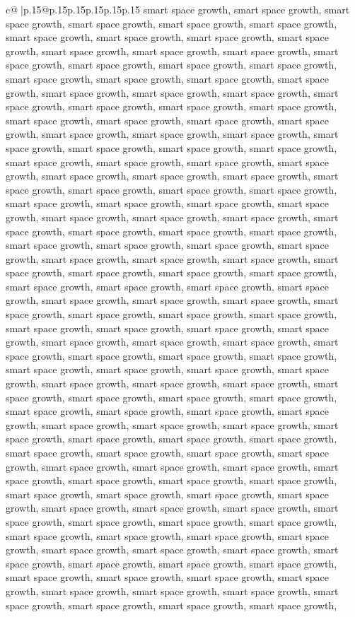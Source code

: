 \documentclass{article}
\begin{document}
{\begin{supertabular}{c@{$\;$}|p{.15\linewidth}@{}p{.15\linewidth}p{.15\linewidth}p{.15\linewidth}p{.15\linewidth}p{.15\linewidth}}
{{{smart space growth, smart space growth, smart space growth, smart space growth, smart space growth, smart space growth, smart space growth, smart space growth, smart space growth, smart space growth, smart space growth, smart space growth, smart space growth, smart space growth, smart space growth, smart space growth, smart space growth, smart space growth, smart space growth, smart space growth, smart space growth, smart space growth, smart space growth, smart space growth, smart space growth, smart space growth, smart space growth, smart space growth, smart space growth, smart space growth, smart space growth, smart space growth, smart space growth, smart space growth, smart space growth, smart space growth, smart space growth, smart space growth, smart space growth, smart space growth, smart space growth, smart space growth, smart space growth, smart space growth, smart space growth, smart space growth, smart space growth, smart space growth, smart space growth, smart space growth, smart space growth, smart space growth, smart space growth, smart space growth, smart space growth, smart space growth, smart space growth, smart space growth, smart space growth, smart space growth, smart space growth, smart space growth, smart space growth, smart space growth, smart space growth, smart space growth, smart space growth, smart space growth, smart space growth, smart space growth, smart space growth, smart space growth, smart space growth, smart space growth, smart space growth, smart space growth, smart space growth, smart space growth, smart space growth, smart space growth, smart space growth, smart space growth, smart space growth, smart space growth, smart space growth, smart space growth, smart space growth, smart space growth, smart space growth, smart space growth, smart space growth, smart space growth, smart space growth, smart space growth, smart space growth, smart space growth, smart space growth, smart space growth, smart space growth, smart space growth, smart space growth, smart space growth, smart space growth, smart space growth, smart space growth, smart space growth, smart space growth, smart space growth, smart space growth, smart space growth, smart space growth, smart space growth, smart space growth, smart space growth, smart space growth, smart space growth, smart space growth, smart space growth, smart space growth, smart space growth, smart space growth, smart space growth, smart space growth, smart space growth, smart space growth, smart space growth, smart space growth, smart space growth, smart space growth, smart space growth, smart space growth, smart space growth, smart space growth, smart space growth, smart space growth, smart space growth, smart space growth, smart space growth, smart space growth, smart space growth, smart space growth, smart space growth, smart space growth, smart space growth, smart space growth, smart space growth, smart space growth, smart space growth, smart space growth, smart space growth, smart space growth, smart space growth, smart space growth, smart space growth, smart space growth, smart space growth, smart space growth, smart space growth, smart space growth, smart space growth, }}}
\end{supertabular}}
\end{document}
